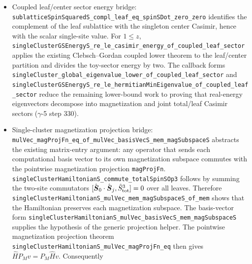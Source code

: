 \documentclass[a4paper,11pt]{article}
\begin{document}
\begin{itemize}
        remove the leaf upper-bound hypothesis from the lower-bound
        bridge, and the companion wrappers
        \texttt{singleClusterHamiltonianS\_minEigenvalue\_eq\_gs\_of\_gs\_sector\_and\_joint\_casimir\_total\_lower}
        and
        \texttt{singleClusterHamiltonianS\_minEigenvalue\_eq\_gs\_of\_exists\_gs\_sector\_and\_joint\_casimir\_total\_lower}
        package the corresponding conditional equality endpoints
        ($\gamma$-5 step 329).
  \item Coupled leaf/center sector energy bridge:
        \texttt{sublatticeSpinSquaredS\_compl\_leaf\_eq\_spinSDot\_zero\_zero}
        identifies the complement of the leaf sublattice with the
        singleton center Casimir, hence with the scalar single-site value.
        For $1\le z$,
        \texttt{singleClusterGSEnergyS\_re\_le\_casimir\_energy\_of\_coupled\_leaf\_sector}
        applies the existing Clebsch--Gordan coupled lower theorem to the
        leaf/center partition and divides the toy-sector energy by two.
        The callback forms
        \texttt{singleCluster\_global\_eigenvalue\_lower\_of\_coupled\_leaf\_sector}
        and
        \texttt{singleClusterGSEnergyS\_re\_le\_hermitianMinEigenvalue\_of\_coupled\_leaf\_sector}
        reduce the remaining lower-bound work to proving that real-energy
        eigenvectors decompose into magnetization and joint total/leaf
        Casimir sectors ($\gamma$-5 step 330).
  \item Single-cluster magnetization projection bridge:
        \texttt{mulVec\_magProjFn\_eq\_of\_mulVec\_basisVecS\_mem\_magSubspaceS}
        abstracts the existing matrix-entry argument: any operator that sends
        each computational basis vector to its own magnetization subspace
        commutes with the pointwise magnetization projection \texttt{magProjFn}.
        \texttt{singleClusterHamiltonianS\_commute\_totalSpinSOp3}
        follows by summing the two-site commutators
        $[\hat{\boldsymbol S}_0\cdot\hat{\boldsymbol S}_j,
        \hat S^3_{\rm tot}]=0$ over all leaves.  Therefore
        \texttt{singleClusterHamiltonianS\_mulVec\_mem\_magSubspaceS\_of\_mem}
        shows that the Hamiltonian preserves each magnetization subspace.
        The basis-vector form
        \texttt{singleClusterHamiltonianS\_mulVec\_basisVecS\_mem\_magSubspaceS}
        supplies the hypothesis of the generic projection helper.
        The pointwise magnetization projection theorem
        \texttt{singleClusterHamiltonianS\_mulVec\_magProjFn\_eq}
        then gives
        $\hat H P_M v = P_M \hat H v$.  Consequently

\end{itemize}
\end{document}
